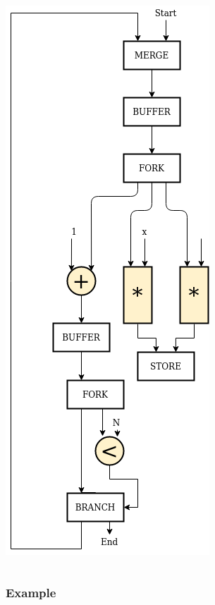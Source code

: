 \documentclass{beamer}
\begin{document}
\begin{frame}[fragile]
\begin{columns}[T]
\begin{column}{0.45\textwidth}
      \includegraphics[scale=0.28]{base_case.png}
    \end{column}
  \end{columns}
\end{frame}

\begin{frame}[fragile]
\frametitle{Example}

\end{frame}
\end{document}
